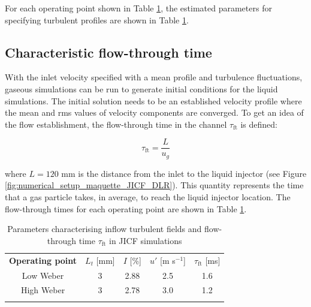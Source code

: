 For each operating point shown in Table \ref{tab:jicf_operating_conditions_turbulent_injection_parameters}, the estimated parameters for specifying turbulent profiles are shown in Table \ref{tab:jicf_operating_conditions_turbulent_injection_parameters}.


\subsection*{Characteristic flow-through time}

With the inlet velocity specified with a mean profile and turbulence fluctuations, gaseous simulations can be run to generate initial conditions for the liquid simulations. The initial solution needs to be an established velocity profile where the mean and rms values of velocity components are converged. To get an idea of the flow establishment, the flow-through time in the channel $\tau_\mathrm{ft}$ is defined:

\begin{equation}
\tau_\mathrm{ft} = \frac{L}{u_g}
\end{equation}

where $L = 120$ mm is the distance from the inlet to the liquid injector (see Figure \ref{fig:numerical_setup_maquette_JICF_DLR}). This quantity represents the time that a gas particle takes, in average, to reach the liquid injector location. The flow-through times for each operating point are shown in Table \ref{tab:jicf_operating_conditions_turbulent_injection_parameters}.

\begin{table}[!h]
\centering
\caption{Parameters characterising inflow turbulent fields and flow-through time $\tau_\mathrm{ft}$ in JICF simulations}
\begin{tabular}{ccccc}
\thickhline
\textbf{Operating point} &  $L_t$ [mm] &  $I$ [\%] & $u'$ [m s$^{-1}$] & $\tau_\mathrm{ft}$ [ms] \\ %
\thickhline
Low Weber & 3 & 2.88 & 2.5 & 1.6 \\
High Weber & 3 & 2.78 & 3.0 & 1.2  \\
\thickhline
\end{tabular}
\label{tab:jicf_operating_conditions_turbulent_injection_parameters}
\end{table}



